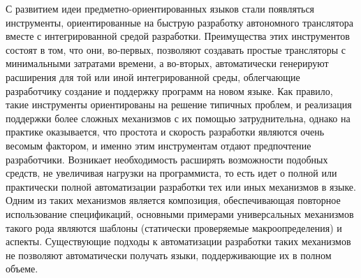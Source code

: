 С развитием идеи предметно-ориентированных языков стали появляться инструменты, ориентированные на быструю разработку автономного транслятора вместе с интегрированной средой разработки. Преимущества этих инструментов состоят в том, что они, во-первых, позволяют создавать простые трансляторы с минимальными затратами времени, а во-вторых, автоматически генерируют расширения для той или иной интегрированной среды, облегчающие разработчику создание и поддержку программ на новом языке. Как правило, такие инструменты ориентированы на решение типичных проблем, и реализация поддержки более сложных механизмов с их помощью затруднительна, однако на практике оказывается, что простота и скорость разработки являются очень весомым фактором, и именно этим инструментам отдают предпочтение разработчики. Возникает необходимость расширять возможности подобных средств, не увеличивая нагрузки на программиста, то есть идет о полной или практически полной автоматизации разработки тех или иных механизмов в языке. Одним из таких механизмов является композиция, обеспечивающая повторное использование спецификаций, основными примерами универсальных механизмов такого рода являются шаблоны (статически проверяемые макроопределения) и аспекты. Существующие подходы к автоматизации разработки таких механизмов не позволяют автоматически получать языки, поддерживающие их в полном объеме.